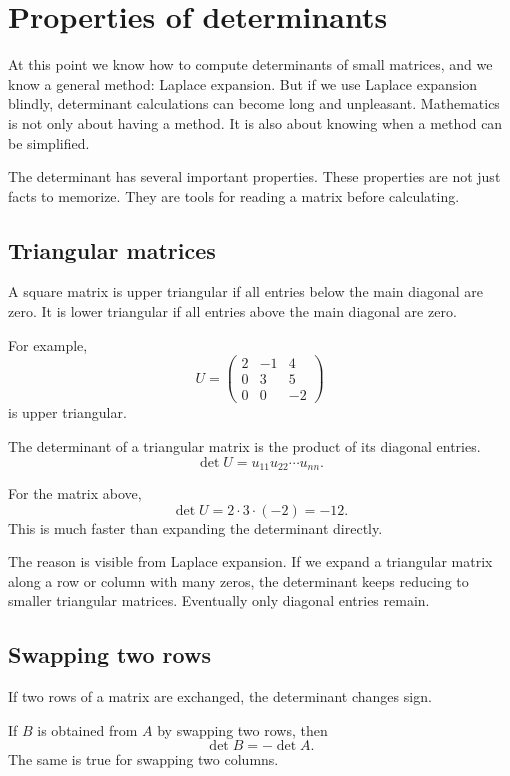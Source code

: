 \section{Properties of determinants}

At this point we know how to compute determinants of small matrices, and we know a general method: Laplace expansion. But if we use Laplace expansion blindly, determinant calculations can become long and unpleasant. Mathematics is not only about having a method. It is also about knowing when a method can be simplified.

The determinant has several important properties. These properties are not just facts to memorize. They are tools for reading a matrix before calculating.

\subsection{Triangular matrices}

A square matrix is upper triangular if all entries below the main diagonal are zero. It is lower triangular if all entries above the main diagonal are zero.

For example,
\[
U=\begin{pmatrix}
2&-1&4\\
0&3&5\\
0&0&-2
\end{pmatrix}
\]
is upper triangular.

\begin{theorembox}
The determinant of a triangular matrix is the product of its diagonal entries.
\[
\det U=u_{11}u_{22}\cdots u_{nn}.
\]
\end{theorembox}

For the matrix above,
\[
\det U=2\cdot3\cdot(-2)=-12.
\]
This is much faster than expanding the determinant directly.

The reason is visible from Laplace expansion. If we expand a triangular matrix along a row or column with many zeros, the determinant keeps reducing to smaller triangular matrices. Eventually only diagonal entries remain.

\subsection{Swapping two rows}

If two rows of a matrix are exchanged, the determinant changes sign.

\begin{theorembox}
If \(B\) is obtained from \(A\) by swapping two rows, then
\[
\det B=-\det A.
\]
The same is true for swapping two columns.
\end{theorembox}

